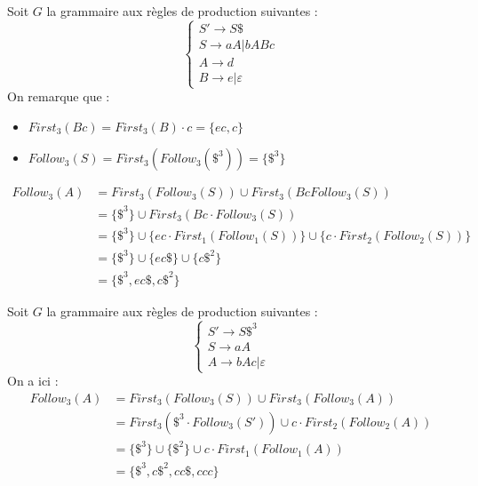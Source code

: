 \begin{example}
    Soit $G$ la grammaire aux règles de production suivantes : 
        $$ 
            \begin{cases}
                S' \to S \$ \\ 
                S \to aA | bABc \\ 
                A \to d \\ 
                B \to e | \varepsilon 
            \end{cases}
        $$
    On remarque que : 
        \begin{itemize}
            \item $First_3(Bc) = First_3(B) \cdot c = \{ec, c\}$ 
            \item $Follow_3(S) = First_3(Follow_3(\$^3)) = \{\$^3\}$
        \end{itemize}
        \begin{align*}
            Follow_3(A) &= First_3(Follow_3(S)) \cup First_3(Bc Follow_3(S)) \\ 
            &= \{\$^3\} \cup First_3(Bc \cdot Follow_3(S)) \\ 
            &= \{\$^3\} \cup \{ec \cdot First_1(Follow_1(S))\} \cup \{c \cdot First_2(Follow_2(S))\} \\ 
            &= \{\$^3\} \cup \{ec\$\} \cup \{c\$^2\} \\ 
            &= \{\$^3, ec\$, c\$^2\} 
        \end{align*}
\end{example}

\begin{example}
    Soit $G$ la grammaire aux règles de production suivantes : 
        $$ 
            \begin{cases}
                S' \to S \$^3 \\ 
                S \to aA \\ 
                A \to bAc | \varepsilon
            \end{cases}
        $$ 
    On a ici : 
    \begin{align*}
        Follow_3(A) &= First_3(Follow_3(S)) \cup First_3(Follow_3(A)) \\ 
        &= First_3(\$^3 \cdot Follow_3(S')) \cup c \cdot First_2(Follow_2(A)) \\ 
        &= \{\$^3\} \cup \{\$^2\} \cup c \cdot First_1(Follow_1(A)) \\ 
        &= \{\$^3, c\$^2, cc\$, c c c\}
    \end{align*}
\end{example}

